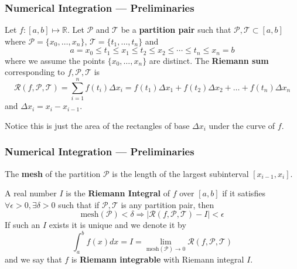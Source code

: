 \documentclass[11pt,xcolor={svgnames},aspectratio=169,usepdftitle=false,notheorems]{beamer}
\begin{document}
\begin{frame}
  \frametitle{Numerical Integration --- Preliminaries}
\begin{definition}
  Let $f : [a,b]\mapsto\mathbb{R}$. Let $\mathcal{P}$ and $\mathcal{T}$ be a \alert{\textbf{partition pair}} such that $\mathcal{P},\mathcal{T}\subset [a,b]$ where $\mathcal{P} = \{x_0,\ldots,x_n\}$, $\mathcal{T} = \{t_1,\ldots,t_n\}$ and 
  \[
  a = x_0 \leq t_1 \leq x_1 \leq t_2 \leq x_2 \leq \cdots \leq t_n \leq x_n = b  
  \]
  where we assume the points $\{x_0,\ldots,x_n\}$ are distinct. The \alert{\textbf{Riemann sum}} corresponding to $f,\mathcal{P},\mathcal{T}$ is
  \[
  \mathcal{R}(f,\mathcal{P},\mathcal{T}) = \sum^n_{i=1}f(t_i)\Delta x_i = f(t_1)\Delta x_1 + f(t_2)\Delta x_2 + \ldots + f(t_n)\Delta x_n
  \]
  and $\Delta x_i = x_i - x_{i-1}$.
\end{definition}

{\footnotesize Notice this is just the area of the rectangles of base $\Delta x_i$ under the curve of $f$.}
\end{frame}

\begin{frame}
  \frametitle{Numerical Integration --- Preliminaries}
\begin{definition}
The \alert{\textbf{mesh}} of the partition $\mathcal{P}$ is the length of the largest subinterval $[x_{i-1},x_i]$.
\end{definition}
\begin{definition}
A real number $I$ is the \alert{\textbf{Riemann Integral}} of $f$ over $[a,b]$ if it satisfies $\forall \epsilon > 0, \exists \delta > 0$ such that if $\mathcal{P},\mathcal{T}$ is any partition pair, then
\[
\text{mesh}(\mathcal{P}) < \delta \Rightarrow \lvert \mathcal{R}(f,\mathcal{P},\mathcal{T}) - I \rvert < \epsilon
\]
If such an $I$ exists it is unique and we denote it by
\[
\int^b_a f(x)  dx = I = \lim_{\text{mesh}(\mathcal{P})\rightarrow 0} \mathcal{R}(f,\mathcal{P},\mathcal{T})
\]
and we say that $f$ is \alert{\textbf{Riemann integrable}} with Riemann integral $I$.
\end{definition}
\end{frame}
\end{document}
